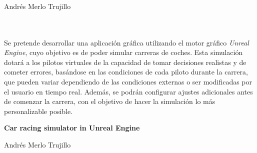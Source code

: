 \chapter*{}






\cleardoublepage
\thispagestyle{empty}

\begin{center}
{\large\bfseries \myTitle}\\
\end{center}
\begin{center}
Andrés Merlo Trujillo\\
\end{center}

\\

\vspace{0.7cm}
\\

Se pretende desarrollar una aplicación gráfica utilizando el motor gráfico \textit{Unreal Engine}, cuyo objetivo es de poder simular carreras de coches. Esta simulación dotará a los pilotos virtuales de la capacidad de tomar decisiones realistas y de cometer errores, basándose en las condiciones de cada piloto durante la carrera, que pueden variar dependiendo de las condiciones externas o ser modificadas por el usuario en tiempo real. Además, se podrán configurar ajustes adicionales antes de comenzar la carrera, con el objetivo de hacer la simulación lo más personalizable posible.

\cleardoublepage


\thispagestyle{empty}


\begin{center}
{\large\bfseries Car racing simulator in Unreal Engine}\\
\end{center}
\begin{center}
Andrés Merlo Trujillo\\
\end{center}

\\

